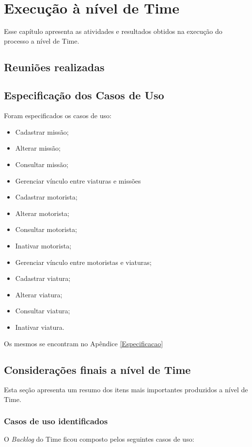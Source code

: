 \chapter{Execução à nível de Time}

  Esse capítulo apresenta as atividades e resultados obtidos na execução do processo a nível de Time.
  
  \section{Reuniões realizadas}
  
  
  \section{Especificação dos Casos de Uso}
 
  Foram especificados os casos de uso:
  
  \begin{itemize}
    \item Cadastrar missão;
    \item Alterar missão;
    \item Consultar missão;
    \item Gerenciar vínculo entre viaturas e missões
    \item Cadastrar motorista;
    \item Alterar motorista;
    \item Consultar motorista;
    \item Inativar motorista;
    \item Gerenciar vínculo entre motoristas e viaturas;
    \item Cadastrar viatura;
    \item Alterar viatura;
    \item Consultar viatura;
    \item Inativar viatura.
  \end{itemize}

  
  Os mesmos se encontram no Apêndice \ref{Especificacao}
  
  \section{Considerações finais a nível de Time}
    
    Esta seção apresenta um resumo dos itens mais importantes produzidos a nível de Time.
    
    \subsection{Casos de uso identificados} 
      
      O \textit{Backlog} do Time ficou composto pelos seguintes casos de uso:
      
      
